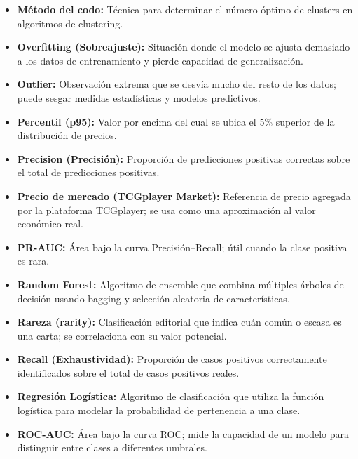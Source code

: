 \documentclass[12pt,letterpaper]{article}
\begin{document}
\begin{itemize}
    \item \textbf{Método del codo:} Técnica para determinar el número óptimo de clusters en algoritmos de clustering.
    
    \item \textbf{Overfitting (Sobreajuste):} Situación donde el modelo se ajusta demasiado a los datos de entrenamiento y pierde capacidad de generalización.
    
    \item \textbf{Outlier:} Observación extrema que se desvía mucho del resto de los datos; puede sesgar medidas estadísticas y modelos predictivos.
    
    \item \textbf{Percentil (p95):} Valor por encima del cual se ubica el 5\% superior de la distribución de precios.
    
    \item \textbf{Precision (Precisión):} Proporción de predicciones positivas correctas sobre el total de predicciones positivas.
    
    \item \textbf{Precio de mercado (TCGplayer Market):} Referencia de precio agregada por la plataforma TCGplayer; se usa como una aproximación al valor económico real.
    
    \item \textbf{PR-AUC:} Área bajo la curva Precisión–Recall; útil cuando la clase positiva es rara.
    
    \item \textbf{Random Forest:} Algoritmo de ensemble que combina múltiples árboles de decisión usando bagging y selección aleatoria de características.
    
    \item \textbf{Rareza (rarity):} Clasificación editorial que indica cuán común o escasa es una carta; se correlaciona con su valor potencial.
    
    \item \textbf{Recall (Exhaustividad):} Proporción de casos positivos correctamente identificados sobre el total de casos positivos reales.
    
    \item \textbf{Regresión Logística:} Algoritmo de clasificación que utiliza la función logística para modelar la probabilidad de pertenencia a una clase.
    
    \item \textbf{ROC-AUC:} Área bajo la curva ROC; mide la capacidad de un modelo para distinguir entre clases a diferentes umbrales.
    

\end{itemize}
\end{document}
